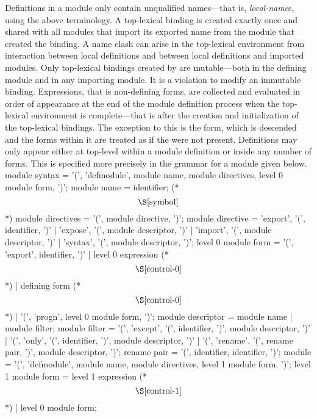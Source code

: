 %
\begin{optDefinition}
Definitions in a module only contain unqualified names---that is, {\em
    local-name}s, using the above terminology.  A top-lexical binding is created
exactly once and shared with all modules that import its exported name from the
module that created the binding.  A name clash can arise in the top-lexical
environment from interaction between local definitions and between local
definitions and imported modules.  Only top-lexical bindings created by
 are mutable---both in the defining module and in any
importing module.  It is a violation to modify an immutable binding.
Expressions, that is non-defining forms, are collected and evaluated in order of
appearance at the end of the module definition process when the top-lexical
environment is complete---that is after the creation and initialization of the
top-lexical bindings.  The exception to this is the  form,
which is descended and the forms within it are treated as if the
 were not present.  Definitions may only appear either at
top-level within a module definition or inside any number of 
forms.  This is specified more precisely in the grammar for a module given
below.
%
\Syntax
\savesyntax{}\vbox{
\syntax
module syntax
   = '(', 'defmodule', module name,
     module directives, {level 0 module form}, ')';
module name
   = identifier; (* \[\S\ref{symbol}\] *)
module directives
   = '(', {module directive}, ')';
module directive
   = 'export', '(', {identifier}, ')'
   | 'expose', '(', {module descriptor}, ')'
   | 'import', '(', {module descriptor}, ')'
   | 'syntax', '(', {module descriptor}, ')';
level 0 module form
   = '(', 'export', {identifier}, ')'
   | level 0 expression (* \[\S\ref{control-0}\] *)
   | defining form (* \[\S\ref{control-0}\] *)
   | '(', 'progn', {level 0 module form}, ')';
module descriptor
   = module name
   | module filter;
module filter
   = '(', 'except', '(', {identifier}, ')',
     module descriptor, ')'
   | '(', 'only', '(', {identifier}, ')',
     module descriptor, ')'
   | '(', 'rename', '(', {rename pair}, ')',
     module descriptor, ')';
rename pair
   = '(', identifier, identifier, ')';
\endsyntax
}
%
\savesyntax{}\vbox{
\syntax
module
   = '(', 'defmodule', module name,
     module directives, {level 1 module form}, ')';
level 1 module form
   = level 1 expression (* \[\S\ref{control-1}\] *)
   | level 0 module form;
\endsyntax
}
\label{defmodule-syntax}
%
\end{optDefinition}

